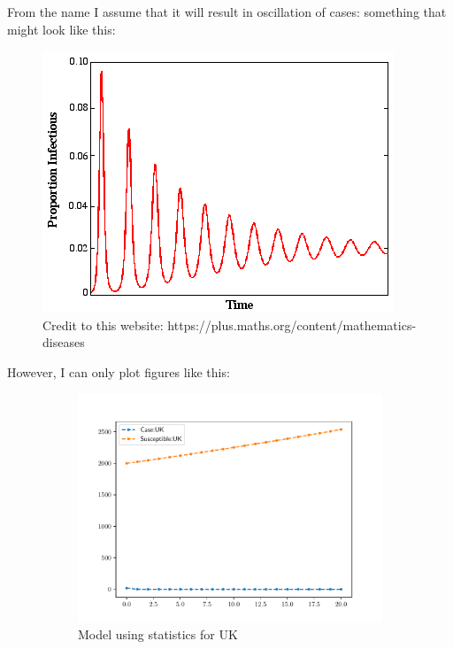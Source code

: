 \begin{homeworkProblem}
From the name I assume that it will result in oscillation of cases: something 
that might look like this:
\begin{figure}[htbp]
    \centering
\includegraphics[scale=0.6]{fig/fig(16)(suppose).png}
\caption{Credit to {\color{blue} this website: https://plus.maths.org/content/mathematics-diseases}}
\end{figure}
However, I can only plot figures like this:
\begin{figure}[htbp]
    \begin{subfigure}{0.4\linewidth}
    \includegraphics[scale=0.6]{fig/fig16(f)(1).pdf}
    \caption{Model using statistics for UK}
    \end{subfigure}
    \hfill
    \begin{subfigure}{0.4\linewidth}

\end{subfigure}
\end{figure}
\end{homeworkProblem}
